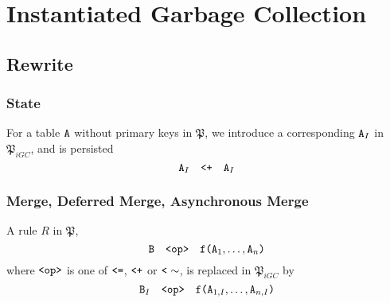 \documentclass{article}
\numberwithin{equation}{section}
\renewcommand{\tt}[1]{\ifmmode\text{\texttt{#1}}\else\texttt{#1}\fi}
\begin{document}






\section{Instantiated Garbage Collection}
\label{sec:instantiated}

\subsection{Rewrite}

\subsubsection{State}
For a table $\tt{A}$ without primary keys in $\mathfrak{P}$, we introduce a corresponding $\tt{A}_I$ in $\mathfrak{P}_{iGC}$, and is persisted
\[\tt{A}_I \quad\tt{<+}\quad \tt{A}_I\]

\subsubsection{Merge, Deferred Merge, Asynchronous Merge}
A rule $R$ in $\mathfrak{P}$,
\[\tt{B} \quad\tt{<op>}\quad \tt{f}\tt{(}\tt{A}_1,\dots,\tt{A}_n\tt{)}\]
where $\tt{<op>}$ is one of $\tt{<=}$, $\tt{<+}$ or $\tt{<}\sim$, is replaced in $\mathfrak{P}_{iGC}$ by
\[\tt{B}_I \quad\tt{<op>}\quad \tt{f}\tt{(}\tt{A}_{1,I},\dots,\tt{A}_{n,I}\tt{)}\]
\end{document}
